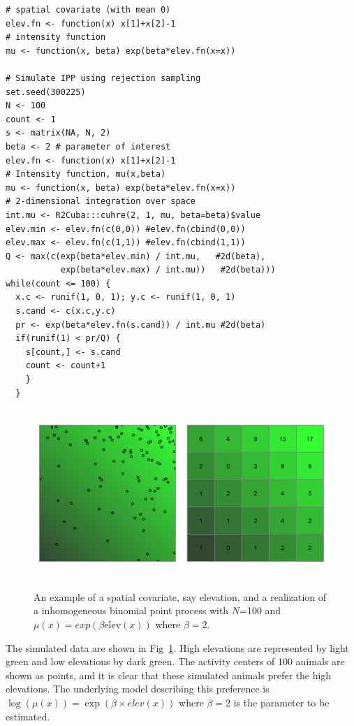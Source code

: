 \begin{small}
\begin{verbatim}
# spatial covariate (with mean 0)
elev.fn <- function(x) x[1]+x[2]-1
# intensity function
mu <- function(x, beta) exp(beta*elev.fn(x=x))

# Simulate IPP using rejection sampling
set.seed(300225)
N <- 100
count <- 1
s <- matrix(NA, N, 2)
beta <- 2 # parameter of interest
elev.fn <- function(x) x[1]+x[2]-1
# Intensity function, mu(x,beta)
mu <- function(x, beta) exp(beta*elev.fn(x=x))
# 2-dimensional integration over space
int.mu <- R2Cuba:::cuhre(2, 1, mu, beta=beta)$value
elev.min <- elev.fn(c(0,0)) #elev.fn(cbind(0,0))
elev.max <- elev.fn(c(1,1)) #elev.fn(cbind(1,1))
Q <- max(c(exp(beta*elev.min) / int.mu,   #2d(beta),
           exp(beta*elev.max) / int.mu))   #2d(beta)))
while(count <= 100) {
  x.c <- runif(1, 0, 1); y.c <- runif(1, 0, 1)
  s.cand <- c(x.c,y.c)
  pr <- exp(beta*elev.fn(s.cand)) / int.mu #2d(beta)
  if(runif(1) < pr/Q) {
    s[count,] <- s.cand
    count <- count+1
    }
  }
\end{verbatim}
\end{small}


\begin{figure}[ht]
\centering
\includegraphics[width=5in,height=2.5in]{Ch11/figs/heteroPlots}
\label{state-space.fig.hetero}
\caption{An example of a spatial covariate, say elevation, and a
  realization of a inhomogeneous binomial point process with $N$=100
  and $\mu(x) = exp(\beta \mbox{elev}(x))$ where $\beta=2$.}
\end{figure}

The simulated data are shown in Fig~\ref{state-space.fig.hetero}. High elevations
are represented by light green and low elevations by dark green. The
activity centers of 100 animals are shown as
points, and it is clear that these simulated animals prefer the high
elevations.  %
The underlying model describing this preference is
$\log(\mu(x)) = \exp(\beta \times elev(x))$
where $\beta=2$ is the parameter to be estimated.

